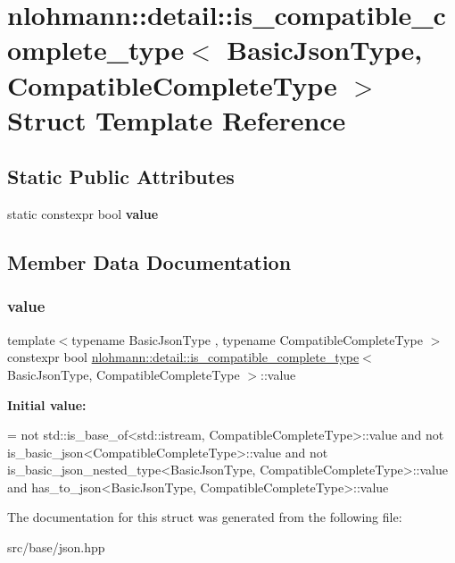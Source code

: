 \hypertarget{structnlohmann_1_1detail_1_1is__compatible__complete__type}{}\section{nlohmann\+:\+:detail\+:\+:is\+\_\+compatible\+\_\+complete\+\_\+type$<$ Basic\+Json\+Type, Compatible\+Complete\+Type $>$ Struct Template Reference}
\label{structnlohmann_1_1detail_1_1is__compatible__complete__type}
\subsection*{Static Public Attributes}
\begin{DoxyCompactItemize}
\item 
static constexpr bool {\bfseries value}
\end{DoxyCompactItemize}


\subsection{Member Data Documentation}
\mbox{\label{structnlohmann_1_1detail_1_1is__compatible__complete__type_a34bed4700a302b79feb045b6bdbda9aa}} 
\subsubsection{\texorpdfstring{value}{value}}
{\footnotesize\ttfamily template$<$typename Basic\+Json\+Type , typename Compatible\+Complete\+Type $>$ \\
constexpr bool \mbox{\hyperlink{structnlohmann_1_1detail_1_1is__compatible__complete__type}{nlohmann\+::detail\+::is\+\_\+compatible\+\_\+complete\+\_\+type}}$<$ Basic\+Json\+Type, Compatible\+Complete\+Type $>$\+::value\hspace{0.3cm}{\ttfamily [static]}}

{\bfseries Initial value\+:}
\begin{DoxyCode}
=
        not std::is\_base\_of<std::istream, CompatibleCompleteType>::value and
        not is\_basic\_json<CompatibleCompleteType>::value and
        not is\_basic\_json\_nested\_type<BasicJsonType, CompatibleCompleteType>::value and
        has\_to\_json<BasicJsonType, CompatibleCompleteType>::value
\end{DoxyCode}


The documentation for this struct was generated from the following file\+:\begin{DoxyCompactItemize}
\item 
src/base/json.\+hpp\end{DoxyCompactItemize}
